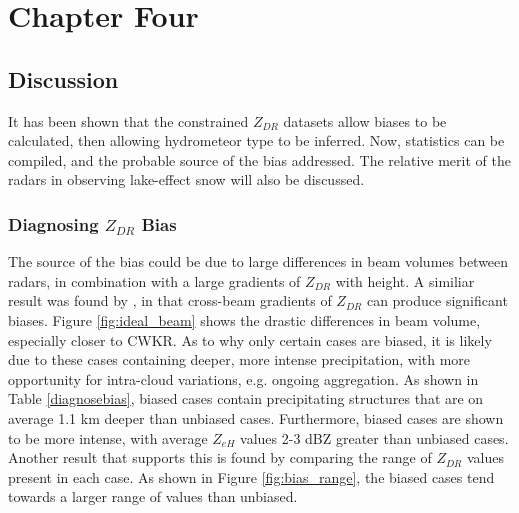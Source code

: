\chapter{Chapter Four}
\section{Discussion}
It has been shown that the constrained $Z_{DR}$ datasets allow biases to be calculated, then allowing hydrometeor type to be inferred. Now, statistics can be compiled, and the probable source of the bias addressed. The relative merit of the radars in observing lake-effect snow will also be discussed.
\subsection{Diagnosing $Z_{DR}$ Bias}
The source of the bias could be due to large differences in beam volumes between radars, in combination with a large gradients of $Z_{DR}$ with height. A similiar result was found by \citep{Ryzhkov2007a}, in that cross-beam gradients of $Z_{DR}$ can produce significant biases. Figure \ref{fig:ideal_beam} shows the drastic differences in beam volume, especially closer to CWKR. As to why only certain cases are biased, it is likely due to these cases containing deeper, more intense precipitation, with more opportunity for intra-cloud variations, e.g. ongoing aggregation. As shown in Table \ref{diagnosebias}, biased cases contain precipitating structures that are on average 1.1 km deeper than unbiased cases. Furthermore, biased cases are shown to be more intense, with average $Z_{eH}$ values 2-3 dBZ greater than unbiased cases. 
Another result that supports this is found by comparing the range of $Z_{DR}$ values present in each case. As shown in Figure \ref{fig:bias_range}, the biased cases tend towards a larger range of values than unbiased. 
